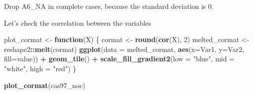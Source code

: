 \documentclass[]{article}
\newenvironment{Shaded}{\begin{snugshade}}{\end{snugshade}}
\newcommand{\ControlFlowTok}[1]{\textcolor[rgb]{0.13,0.29,0.53}{\textbf{#1}}}
\newcommand{\DataTypeTok}[1]{\textcolor[rgb]{0.13,0.29,0.53}{#1}}
\newcommand{\DecValTok}[1]{\textcolor[rgb]{0.00,0.00,0.81}{#1}}
\newcommand{\KeywordTok}[1]{\textcolor[rgb]{0.13,0.29,0.53}{\textbf{#1}}}
\newcommand{\NormalTok}[1]{#1}
\newcommand{\OperatorTok}[1]{\textcolor[rgb]{0.81,0.36,0.00}{\textbf{#1}}}
\newcommand{\OtherTok}[1]{\textcolor[rgb]{0.56,0.35,0.01}{#1}}
\newcommand{\StringTok}[1]{\textcolor[rgb]{0.31,0.60,0.02}{#1}}
\begin{document}
Drop A6\_NA in complete cases, because the standard deviation is 0.

Let's check the correlation between the variables

\begin{Shaded}
\begin{Highlighting}[]
\NormalTok{plot_cormat <-}\StringTok{ }\ControlFlowTok{function}\NormalTok{(X) \{}
\NormalTok{  cormat <-}\StringTok{ }\KeywordTok{round}\NormalTok{(}\KeywordTok{cor}\NormalTok{(X), }\DecValTok{2}\NormalTok{)}
\NormalTok{  melted_cormat <-}\StringTok{ }\NormalTok{reshape2}\OperatorTok{::}\KeywordTok{melt}\NormalTok{(cormat)}
  \KeywordTok{ggplot}\NormalTok{(}\DataTypeTok{data =}\NormalTok{ melted_cormat, }\KeywordTok{aes}\NormalTok{(}\DataTypeTok{x=}\NormalTok{Var1, }\DataTypeTok{y=}\NormalTok{Var2, }\DataTypeTok{fill=}\NormalTok{value)) }\OperatorTok{+}\StringTok{ }
\StringTok{  }\KeywordTok{geom_tile}\NormalTok{() }\OperatorTok{+}\StringTok{ }\KeywordTok{scale_fill_gradient2}\NormalTok{(}\DataTypeTok{low =} \StringTok{"blue"}\NormalTok{, }\DataTypeTok{mid =} \StringTok{"white"}\NormalTok{, }\DataTypeTok{high =} \StringTok{"red"}\NormalTok{)}
\NormalTok{\}}

\KeywordTok{plot_cormat}\NormalTok{(cas97_noc)}
\end{Highlighting}
\end{Shaded}

\begin{Shaded}
\end{Shaded}
\end{document}
